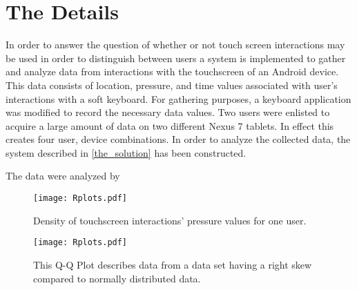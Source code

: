 \section{The Details}
\label{the_details}
In order to answer the question of
whether or not touch screen interactions may be used
in order to distinguish between users
a system is implemented to gather and analyze data
from interactions with the touchscreen of an Android device.
This data consists of location, pressure, and time
values associated with user's interactions with a soft keyboard.
%
For gathering purposes,
a keyboard application was modified to record
the necessary data values.
%
Two users were enlisted to acquire a large 
amount of data on two different Nexus 7 tablets.
In effect this creates four user, device combinations.
%
In order to analyze the collected data,
the system described in \ref{the_solution}
has been constructed.

The data were analyzed by 

\begin{figure}
\centering
\texttt{[image: Rplots.pdf]}
\caption{
Density of touchscreen interactions' pressure values for one user.
}
\label{fig:normal_distribution}
\end{figure}

\begin{figure}
\centering
\texttt{[image: Rplots.pdf]}
\caption{
This Q-Q Plot describes data from
a data set having a right skew compared to normally distributed data.
}
\label{fig:qq_plot}
\end{figure}

